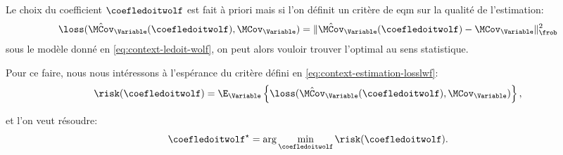 Le choix du coefficient $\coefledoitwolf$ est fait à priori mais si l'on définit un critère de eqm sur la qualité de l'estimation:
\begin{equation}
  \loss(\hat{\MCov}_\Variable(\coefledoitwolf), \MCov_\Variable) = \| \hat{\MCov}_\Variable(\coefledoitwolf) - \MCov_\Variable \|_\frob^2
  \label{eq:context-estimation-losslwf}
\end{equation}
sous le modèle donné en \cref{eq:context-ledoit-wolf}, on peut alors vouloir trouver l'optimal au sens statistique.

Pour ce faire, nous nous intéressons à l'espérance du critère défini en \cref{eq:context-estimation-losslwf}:
$$
  \risk(\coefledoitwolf) = \E_\Variable\left\{\loss(\hat{\MCov}_\Variable(\coefledoitwolf), \MCov_\Variable)\right\},
$$

et l'on veut résoudre:
\begin{equation}
  \coefledoitwolf^\star = \arg\min_\coefledoitwolf \risk(\coefledoitwolf).
\end{equation}


%
%
%
%
%




